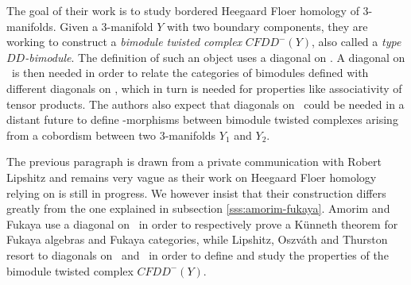 \documentclass[twoside, 12pt]{amsart}
\theoremstyle{remark}
\begin{document}
The goal of their work is to study bordered Heegaard Floer homology of 3-manifolds.
Given a 3-manifold $Y$ with two boundary components, they are working to construct a \emph{bimodule twisted complex} $CFDD^-(Y)$, also called a \emph{type $DD$-bimodule}. The definition of such an object uses a diagonal on \Ainf . A diagonal on \Minf\ is then needed in order to relate the categories of bimodules defined with different diagonals on \Ainf , which in turn is needed for properties like associativity of tensor products. The authors also expect that diagonals on \Minf\ could be needed in a distant future to define \Ainf -morphisms between bimodule twisted complexes arising from a cobordism between two 3-manifolds $Y_1$ and $Y_2$.

The previous paragraph is drawn from a private communication with Robert Lipshitz and remains very vague as their work on Heegaard Floer homology relying on \cite{LOT20} is still in progress. We however insist that their construction differs greatly from the one explained in subsection \ref{sss:amorim-fukaya}. Amorim and Fukaya use a diagonal on \Ainf\ in order to respectively prove a K\"unneth theorem for Fukaya algebras and Fukaya categories, while Lipshitz, Oszv\'ath and Thurston resort to diagonals on \Ainf\ and \Minf\ in order to define and study the properties of the bimodule twisted complex $CFDD^-(Y)$. 

\newpage








\end{document}
